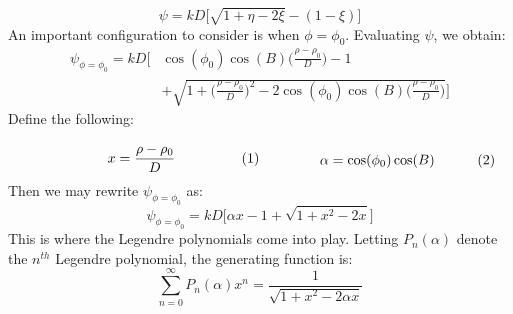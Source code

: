 \documentclass[crop=false,class=book,oneside]{standalone}
\begin{document}
            \begin{equation}
                \psi=kD\big[\sqrt{1+\eta-2\xi}-(1-\xi)\big]
            \end{equation}
            An important configuration to consider is when
            $\phi=\phi_{0}$. Evaluating $\psi$, we obtain:
            \begin{equation}
                \begin{split}
                    \psi_{\phi=\phi_{0}}
                    =kD\Big[&\cos(\phi_{0})\cos(B)
                    \big(\frac{\rho-\rho_{0}}{D}\big)-1\\
                    &+\sqrt{1+
                    \big(\frac{\rho-\rho_{0}}{D}\big)^{2}
                    -2\cos(\phi_{0})\cos(B)
                    \big(\frac{\rho-\rho_{0}}{D}\big)}\Big]
                \end{split}
            \end{equation}
            Define the following:
            \par\hfill\par
            \vspace{-1ex}
            \begin{subequations}
                \begin{minipage}{0.49\textwidth}
                    \begin{equation}
                        x=\frac{\rho-\rho_{0}}{D}
                    \end{equation}
                \end{minipage}
                \hfill
                \begin{minipage}{0.49\textwidth}
                    \begin{equation}
                        \alpha=\cos(\phi_{0})\cos(B)
                    \end{equation}
                \end{minipage}
            \end{subequations}
            Then we may rewrite $\psi_{\phi=\phi_{0}}$ as:
            \begin{equation}
                \psi_{\phi=\phi_{0}}=
                kD\Big[\alpha{x}-1+\sqrt{1+x^{2}-2x}\Big]
            \end{equation}
            This is where the Legendre polynomials
            come into play. Letting $P_{n}(\alpha)$
            denote the $n^{th}$ Legendre polynomial,
            the generating function is:
            \begin{equation}
                \label{eqn:CASSINI:MATH:Legendre_Gen_Func}
                \sum_{n=0}^{\infty}P_{n}(\alpha)x^{n}
                =\frac{1}{\sqrt{1+x^{2}-2\alpha{x}}}
            \end{equation}
\end{document}

